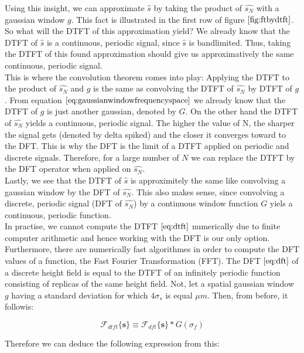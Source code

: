 Using this insight, we can approximate $\hat{s}$ by taking the product of $\hat{s_N}$ with a gaussian window $g$. This fact is illustrated in the first row of figure $\ref{fig:ftbydtft}$. So what will the DTFT of this approximation yield? We already know that the DTFT of $\hat{s}$ is a continuous, periodic signal, since $\hat{s}$ is bandlimited. Thus, taking the DTFT of this found approximation should give us approximatively the same continuous, periodic signal. \\

This is where the convolution theorem comes into play: Applying the DTFT to the product of $\hat{s_N}$ and $g$ is the same as convolving the DTFT of $\hat{s_N}$ by DTFT of $g$. From equation $\ref{eq:gaussianwindowfrequencyspace}$ we already know that the DTFT of $g$ is just another gaussian, denoted by $G$. On the other hand the DTFT of $\hat{s_N}$ yields a continuous, periodic signal. The higher the value of N, the sharper the signal gets (denoted by delta spiked) and the closer it converges toward to the DFT. This is why the DFT is the limit of a DTFT applied on periodic and discrete signals. Therefore, for a large number of $N$ we can replace the DTFT by the DFT operator when applied on $\hat{s_N}$. \\

Lastly, we see that the DTFT of $\hat{s}$ is approximitely the same like convolving a gaussian window by the DFT of $\hat{s_N}$. This also makes sense, since convolving a discrete, periodic signal (DFT of $\hat{s_N}$) by a continuous window function $G$ yiels a continuous, periodic function. \\

In practise, we cannot compute the DTFT $\ref{eq:dtft}$ numerically due to finite computer arithmetic and hence working with the DFT is our only option. Furthermore, there are numerically fast algorithmes in order to compute the DFT values of a function, the Fast Fourier Transformation (FFT). The DFT $\ref{eq:dft}$ of a discrete height field is equal to the DTFT of an infinitely periodic function consisting of replicas of the same height field. Not, let a spatial gaussian window $g$ having a standard deviation for which $4\sigma_s$ is equal $\mu m$. Then, from before, it followis:

\begin{equation}
\mathcal{F}_{dtft}\{\mathbf{s}\} \equiv \mathcal{F}_{dft} \{\mathbf{s}\} * G(\sigma_f)
\end{equation} 

Therefore we can deduce the following expression from this:

